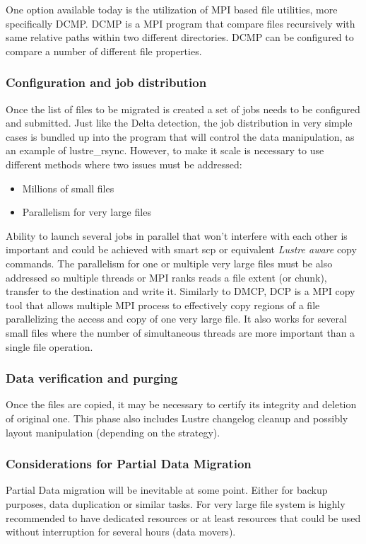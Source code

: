 \documentclass{article}
\begin{document}
One option available today is the utilization of MPI based file utilities, more specifically DCMP. DCMP is a MPI program that compare files recursively with same relative paths within two different directories. DCMP can be configured to compare a number of different file properties. 

\subsubsection{Configuration and job distribution}
Once the list of files to be migrated is created a set of jobs needs to be configured and submitted. Just like the Delta detection, the job distribution in very simple cases is bundled up into the program that will control the data manipulation, as an example of lustre\_rsync. However, to make it scale is necessary to use different methods where two issues must be addressed: 
\begin{itemize}
    \item Millions of small files
    \item Parallelism for very large files
\end{itemize}

Ability to launch several jobs in parallel that won't interfere with each other is important and could be achieved with smart scp or equivalent \textit{Lustre aware} copy commands. 
The parallelism for one or multiple very large files must be also addressed so multiple threads or MPI ranks reads a file extent (or chunk), transfer to the destination and write it. Similarly to DMCP, DCP is a MPI copy tool that allows multiple MPI process to effectively copy regions of a file parallelizing the access and copy of one very large file. It also works for several small files where the number of simultaneous threads are more important than a single file operation.

\subsubsection{Data verification and purging}
Once the files are copied, it may be necessary to certify its integrity and deletion of original one. This phase also includes Lustre changelog cleanup and possibly layout manipulation (depending on the strategy). 

\subsubsection{Considerations for Partial Data Migration}
Partial Data migration will be inevitable at some point. Either for backup purposes, data duplication or similar tasks. For very large file system is highly recommended to have dedicated resources or at least resources that could be used without interruption for several hours (data movers). 
\end{document}
